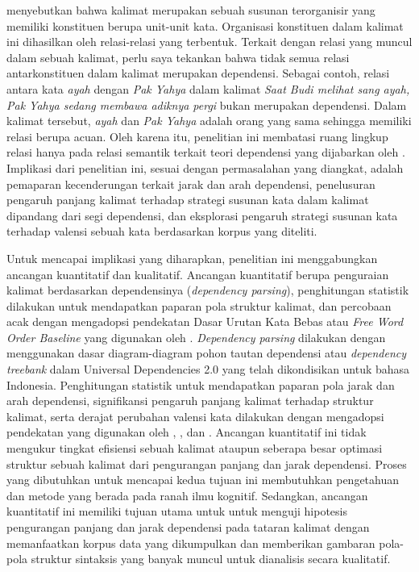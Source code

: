 \cite{tesniere1959elements} menyebutkan bahwa kalimat merupakan sebuah susunan terorganisir yang memiliki konstituen berupa unit-unit kata. Organisasi konstituen dalam kalimat ini dihasilkan oleh relasi-relasi yang terbentuk. Terkait dengan relasi yang muncul dalam sebuah kalimat, perlu saya tekankan bahwa tidak semua relasi antarkonstituen dalam kalimat merupakan dependensi. Sebagai contoh, relasi antara kata \textit{ayah} dengan \textit{Pak Yahya} dalam kalimat \textit{Saat Budi melihat sang ayah, Pak Yahya sedang membawa adiknya pergi} bukan merupakan dependensi. Dalam kalimat tersebut, \textit{ayah} dan \textit{Pak Yahya} adalah orang yang sama sehingga memiliki relasi berupa acuan. Oleh karena itu, penelitian ini membatasi ruang lingkup relasi hanya pada relasi semantik terkait teori dependensi yang dijabarkan oleh \cite{tesniere1959elements}. Implikasi dari penelitian ini, sesuai dengan permasalahan yang diangkat, adalah pemaparan kecenderungan terkait jarak dan arah dependensi, penelusuran pengaruh panjang kalimat terhadap strategi susunan kata dalam kalimat dipandang dari segi dependensi, dan eksplorasi pengaruh strategi susunan kata terhadap valensi sebuah kata berdasarkan korpus yang diteliti. 

Untuk mencapai implikasi yang diharapkan, penelitian ini menggabungkan ancangan kuantitatif dan kualitatif. Ancangan kuantitatif berupa penguraian kalimat berdasarkan dependensinya (\textit{dependency parsing}), penghitungan statistik dilakukan untuk mendapatkan paparan pola struktur kalimat, dan percobaan acak dengan mengadopsi pendekatan Dasar Urutan Kata Bebas atau \textit{Free Word Order Baseline} yang digunakan oleh \cite{futrell2015large}. \textit{Dependency parsing} dilakukan dengan menggunakan dasar diagram-diagram pohon tautan dependensi atau \textit{dependency treebank} dalam Universal Dependencies 2.0 \citep{nivre2017universal} yang telah dikondisikan untuk bahasa Indonesia. Penghitungan statistik untuk mendapatkan paparan pola jarak dan arah dependensi, signifikansi pengaruh panjang kalimat terhadap struktur kalimat, serta derajat perubahan valensi kata dilakukan dengan mengadopsi pendekatan yang digunakan oleh \cite{gildea2010grammars}, \cite{futrell2015large}, \cite{jiang2015effects} dan \cite{liu2017dependency}. Ancangan kuantitatif ini tidak mengukur tingkat efisiensi sebuah kalimat ataupun seberapa besar optimasi struktur sebuah kalimat dari pengurangan panjang dan jarak dependensi. Proses yang dibutuhkan untuk mencapai kedua tujuan ini membutuhkan pengetahuan dan metode yang berada pada ranah ilmu kognitif. Sedangkan, ancangan kuantitatif ini memiliki tujuan utama untuk untuk menguji hipotesis pengurangan panjang dan jarak dependensi pada tataran kalimat dengan memanfaatkan korpus data yang dikumpulkan dan memberikan gambaran pola-pola struktur sintaksis yang banyak muncul untuk dianalisis secara kualitatif.


